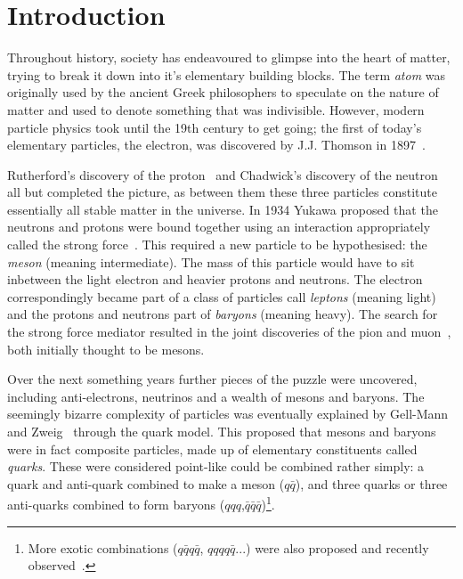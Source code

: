 \chapter{Introduction} 
\label{ch:introduction}

\minitoc 





Throughout history, society has endeavoured to glimpse into the heart of matter, trying to break it down into it's elementary building blocks.
The term \emph{atom} was originally used by the ancient Greek philosophers to speculate on the nature of matter and used to denote something that was indivisible. 
However, modern particle physics took until the 19th century to get going; the first of today's elementary particles, the electron, was discovered by J.J. Thomson in 1897~\cite{electron}.

Rutherford's discovery of the proton~\cite{Rutherford:1911zz} and Chadwick's discovery of the neutron~\cite{Chadwick:1932ma} all but completed the picture, as between them these three particles constitute essentially all stable matter in the universe.  
In 1934 Yukawa proposed that the neutrons and protons were bound together using an interaction appropriately called the strong force~\cite{193548}. This required a new particle to be hypothesised: the \emph{meson} (meaning intermediate). The mass of this particle would have to sit inbetween the light electron and heavier  protons and neutrons. The electron correspondingly became part of a class of particles call \emph{leptons} (meaning light) and the protons and neutrons part of \emph{baryons} (meaning heavy). 
The search for the strong force mediator resulted in the joint discoveries of the pion and muon~\cite{Lattes:1947mw,Lattes:1947mx}, both initially thought to be mesons. 


Over the next {\color{Red}something} years further pieces of the puzzle were uncovered, including anti-electrons, neutrinos and a wealth of mesons and baryons. 
The seemingly bizarre complexity of particles was eventually explained by Gell-Mann~\cite{GellMann:1964nj} and Zweig~\cite{Zweig:1964jf} through the quark model. This proposed that mesons and baryons were in fact composite particles, made up of elementary constituents called \emph{quarks}. These were considered point-like could be combined rather simply: a quark and anti-quark combined to make a meson ($q\bar{q}$), and three quarks or three anti-quarks combined to form baryons ($qqq$,$\bar{q}\bar{q}\bar{q}$)\footnote{More exotic combinations ($q\bar{q}q\bar{q}$, $qqqq\bar{q}$...) were also proposed and recently observed~\cite{PhysRevLett.91.262001,PhysRevLett.115.072001}.}.     


